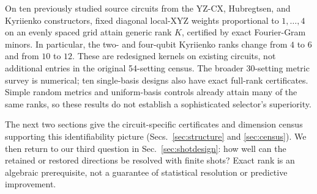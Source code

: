 On ten previously studied source circuits from the YZ-CX,
Hubregtsen, and Kyriienko constructors, fixed diagonal local-XYZ
weights proportional to $1,\ldots,4$ on an evenly spaced grid attain
generic rank $K$, certified by exact Fourier-Gram minors. In
particular, the two- and four-qubit Kyriienko ranks change from
$4$ to $6$ and from $10$ to $12$. These are redesigned kernels on
existing circuits, not additional entries in the original 54-setting
census. The broader 30-setting metric survey is numerical; ten
single-basis designs also have exact full-rank certificates. Simple
random metrics and uniform-basis controls already attain many of the
same ranks, so these results do not establish a sophisticated selector's
superiority.

The next two sections give the circuit-specific certificates and
dimension census supporting this identifiability picture
(Secs.~\ref{sec:structure} and \ref{sec:census}). We then return to
our third question in Sec.~\ref{sec:shotdesign}: how well can the
retained or restored directions be resolved with finite shots?
Exact rank is an algebraic prerequisite, not a guarantee of statistical
resolution or predictive improvement.
